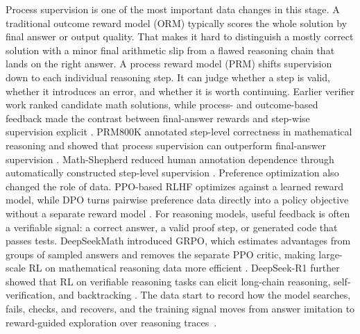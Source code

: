 Process supervision is one of the most important data changes in this stage. A traditional outcome reward model (ORM) typically scores the whole solution by final answer or output quality. That makes it hard to distinguish a mostly correct solution with a minor final arithmetic slip from a flawed reasoning chain that lands on the right answer. A process reward model (PRM) shifts supervision down to each individual reasoning step. It can judge whether a step is valid, whether it introduces an error, and whether it is worth continuing. Earlier verifier work ranked candidate math solutions, while process- and outcome-based feedback made the contrast between final-answer rewards and step-wise supervision explicit \citep{cobbe2021gsm8k,uesato2022solving}. PRM800K annotated step-level correctness in mathematical reasoning and showed that process supervision can outperform final-answer supervision \citep{lightman2024lets}. Math-Shepherd reduced human annotation dependence through automatically constructed step-level supervision \citep{wang2024math}. Preference optimization also changed the role of data. PPO-based RLHF optimizes against a learned reward model, while DPO turns pairwise preference data directly into a policy objective without a separate reward model \citep{schulman2017proximal,rafailov2023direct}. For reasoning models, useful feedback is often a verifiable signal: a correct answer, a valid proof step, or generated code that passes tests. DeepSeekMath introduced GRPO, which estimates advantages from groups of sampled answers and removes the separate PPO critic, making large-scale RL on mathematical reasoning data more efficient \citep{shao2024deepseekmath}. DeepSeek-R1 further showed that RL on verifiable reasoning tasks can elicit long-chain reasoning, self-verification, and backtracking \citep{deepseek2025r1}. The data start to record how the model searches, fails, checks, and recovers, and the training signal moves from answer imitation to reward-guided exploration over reasoning traces~\citep{li2025planet,miyai2025webchorearena,yu2025aworld,bonatti2024windows,ji2026clawarena,lambert2025rewardbench,ma2023let,lai2024step,hwang2024self,zeng2025FSDrive,cheng2026visual}.


